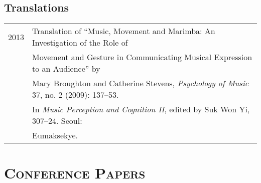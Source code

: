 \documentclass[letter,11pt,draft]{article}
\begin{document}
  \subsection*{Translations}
  \hspace*{-0.25cm}
  \begin{tabular}{p{2.5cm} p{12.5cm}}
    2013 & Translation of “Music, Movement and Marimba: An Investigation of the
    Role of\\
    & Movement and Gesture in Communicating Musical Expression to an Audience”
    by\\
    & Mary Broughton and Catherine Stevens, \textit{Psychology of Music} 37,
    no. 2 (2009): 137–53.\\
    & In \textit{Music Perception and Cognition II}, edited by Suk Won Yi,
    307–24. Seoul:\\
    & Eumaksekye.
%    
  \end{tabular}
  
  \section*{\textsc{Conference Papers}}
  
\end{document}
